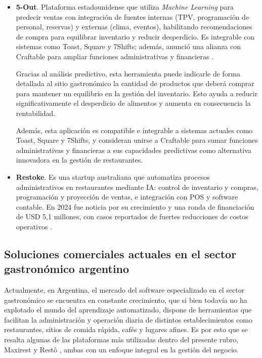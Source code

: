 \begin{itemize}
    \item \textbf{5-Out}. Plataforma estadounidense que utiliza \emph{Machine Learning} para predecir ventas con integración de fuentes internas (TPV, programación de personal, reservas) y externas (clima, eventos), habilitando recomendaciones de compra para equilibrar inventario y reducir desperdicio. Es integrable con sistemas como Toast, Square y 7Shifts; además, anunció una alianza con Craftable para ampliar funciones administrativas y financieras \parencite{fiveout2025partnership}.

        Gracias al análisis predictivo, esta herramienta puede indicarle de forma detallada al sitio gastronómico la cantidad de productos que deberá comprar para mantener un equilibrio en la gestión del inventario. Esto ayuda a reducir significativamente el desperdicio de alimentos y aumenta en consecuencia la rentabilidad. 

        Además, esta aplicación es compatible e integrable a sistemas actuales como Toast, Square y 7Shifts, y consideran unirse a Craftable para sumar funciones administrativas y financieras a sus capacidades predictivas como alternativa innovadora en la gestión de restaurantes. 

    \item \textbf{Restoke}. Es una startup australiana que automatiza procesos administrativos en restaurantes mediante IA: control de inventario y compras, programación y proyección de ventas, e integración con POS y software contable. En 2024 fue noticia por su crecimiento y una ronda de financiación de USD 5,1 millones, con casos reportados de fuertes reducciones de costos operativos \parencite{santoreneos2024restoke}.
\end{itemize}

\subsection{Soluciones comerciales actuales en el sector gastronómico argentino}\label{sec:estado-arg}

Actualmente, en Argentina, el mercado del software especializado en el sector gastronómico se encuentra en constante crecimiento, que si bien todavía no ha explotado el mundo del aprendizaje automatizado, dispone de herramientas que facilitan la administración y operación diaria de distintos establecimientos como restaurantes, sitios de comida rápida, cafés y lugares afines. Es por esto que se resalta algunas de las plataformas más utilizadas dentro del presente rubro, Maxirest y Restô , ambas con un enfoque integral en la gestión del negocio.

